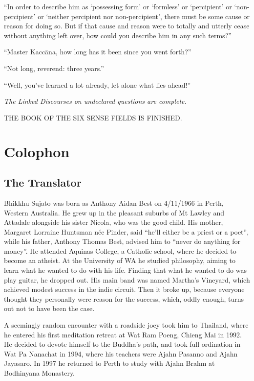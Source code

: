 \documentclass[12pt,openany]{book}%
\newcommand*{\scendsutta}[1]{\begin{center}\textit{#1}\end{center}}
\newcommand*{\scendbook}[1]{\begin{center}\uppercase{#1}\end{center}}
\let\oldbackmatter\backmatter
\renewcommand{\backmatter}{%
\chapterfont{\setstretch{.85}\normalfont\centering}%
\sectionfont{\setstretch{.85}\Semiboldsubheadfont}%
\oldbackmatter}
\begin{document}
“In order to describe him as ‘possessing form’ or ‘formless’ or ‘percipient’ or ‘non-percipient’ or ‘neither percipient nor non-percipient’, there must be some cause or reason for doing so. But if that cause and reason were to totally and utterly cease without anything left over, how could you describe him in any such terms?” 

“Master \textsanskrit{Kaccāna}, how long has it been since you went forth?” 

“Not long, reverend: three years.” 

“Well, you’ve learned a lot already, let alone what lies ahead!” 

\scendsutta{The Linked Discourses on undeclared questions are complete. }

\scendbook{The Book of the Six Sense Fields is finished. }

%
\backmatter%
\chapter*{Colophon}

\section*{The Translator}

Bhikkhu Sujato was born as Anthony Aidan Best on 4/11/1966 in Perth, Western Australia. He grew up in the pleasant suburbs of Mt Lawley and Attadale alongside his sister Nicola, who was the good child. His mother, Margaret Lorraine Huntsman née Pinder, said “he’ll either be a priest or a poet”, while his father, Anthony Thomas Best, advised him to “never do anything for money”. He attended Aquinas College, a Catholic school, where he decided to become an atheist. At the University of WA he studied philosophy, aiming to learn what he wanted to do with his life. Finding that what he wanted to do was play guitar, he dropped out. His main band was named Martha’s Vineyard, which achieved modest success in the indie circuit. Then it broke up, because everyone thought they personally were reason for the success, which, oddly enough, turns out not to have been the case. 

A seemingly random encounter with a roadside joey took him to Thailand, where he entered his first meditation retreat at Wat Ram Poeng, Chieng Mai in 1992. He decided to devote himself to the Buddha’s path, and took full ordination in Wat Pa Nanachat in 1994, where his teachers were Ajahn Pasanno and Ajahn Jayasaro. In 1997 he returned to Perth to study with Ajahn Brahm at Bodhinyana Monastery. 
\end{document}
